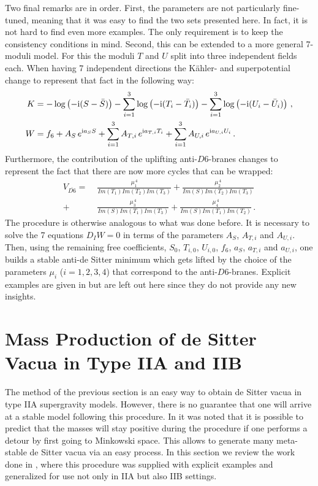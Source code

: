 \documentclass[a4paper,12pt,twoside,openright]{report}
\newcommand{\bea}{\begin{equation}\begin{aligned}}
\newcommand{\eea}{\end{aligned}\end{equation}}
\def\rmi{{\rm i}}
\begin{document}
Two final remarks are in order. First, the parameters are not particularly fine-tuned, meaning that it was easy to find the two sets presented here. In fact, it is not hard to find even more examples. The only requirement is to keep the consistency conditions in mind. Second, this can be extended to a more general 7-moduli model. For this the moduli $T$ and $U$ split into three independent fields each. When having 7 independent directions the Kähler- and superpotential change to represent that fact in the following way:
\bea 
K&=  - \log\left(-\rmi (S-\bar{S})\right) - \sum_{i=1}^3  \log\left(-\rmi (T_i-\bar{T}_i)\right) - \sum_{i=1}^3 \log\left(-\rmi (U_i-\bar{U}_i)\right)\,,\\
W& = f_6 + A_{S}\, e^{\rmi a_S S} +  \sum_{i=1}^3 A_{T,i}\, e^{\rmi a_{T,i} T_i}+ \sum_{i=1}^3 A_{U,i}\, e^{\rmi a_{U,i} U_i}\,.
\eea
Furthermore, the contribution of the uplifting anti-$D6$-branes changes to represent the fact that there are now more cycles that can be wrapped:
\bea
V_{\overline{D6}} =\; &\frac{\mu_1^{\,4}}{Im(T_1)  Im(T_2)  Im(T_3)} +\frac{\mu_2^{\,4}}{Im(S)  Im(T_2)  Im(T_3)} \\+&\frac{\mu_3^{\,4}}{Im(S)  Im(T_1)  Im(T_3)} +\frac{\mu_4^{\,4}}{Im(S)  Im(T_1)  Im(T_2)}\,.
\eea
The procedure is otherwise analogous to what was done before. It is necessary to solve the 7 equations $D_IW=0$ in terms of the parameters $A_S$, $A_{T,i}$ and $A_{U,i}$. Then, using the remaining free coefficients, $S_0$, $T_{i,0}$, $U_{i,0}$, $f_6$, $a_S$, $a_{T,i}$ and $a_{U,i}$, one builds a stable anti-de Sitter minimum which gets lifted by the choice of the parameters $\mu_i$ ($i=1,2,3,4$) that correspond to the anti-$D6$-branes. Explicit examples are given in \cite{Cribiori:2019bfx} but are left out here since they do not provide any new insights.

\section{Mass Production of de Sitter Vacua in Type IIA and IIB}
\label{sec:massprod}
The method of the previous section is an easy way to obtain de Sitter vacua in type IIA supergravity models. However, there is no guarantee that one will arrive at a stable model following this procedure. In \cite{Kallosh:2019zgd} it was noted that it is possible to predict that the masses will stay positive during the procedure if one performs a detour by first going to Minkowski space. This allows to generate many meta-stable de Sitter vacua via an easy process. In this section we review the work done in \cite{Cribiori:2019drf}, where this procedure was supplied with explicit examples and generalized for use not only in IIA but also IIB settings.
\end{document}
